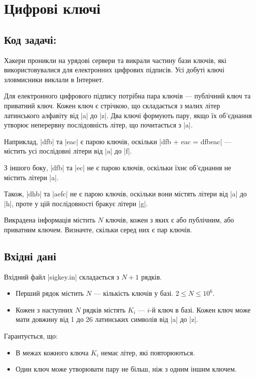 \documentclass[12pt,a4paper]{article}
\begin{document}
\section*{Цифрові ключі \hfill {}}


\subsection*{Код задачі: }

Хакери проникли на урядові сервери та викрали частину бази ключів, які використовувалися для електронних цифрових підписів.
Усі добуті ключі зловмисники виклали в Інтернет.

Для електронного цифрового підпису потрібна пара ключів --- публічний ключ та приватний ключ. Кожен ключ є стрічкою, що складається з малих літер латинського алфавіту від |a| до |z|. Два ключі формують пару, якщо їх об’єднання утворює неперервну послідовність літер, що почитається з |a|.

Наприклад, |dfb| та |eac| є парою ключів, оскільки |dfb + eac = dfbeac| --- містить усі послідовні літери від |a| до |f|.

З іншого боку, |dfb| та |ec| не є парою ключів, оскільки їхнє об'єднання не містить літери |a|.

Також, |dhb| та |aefc| не є парою ключів, оскільки вони містять літери від |a| до |h|, проте у цій послідовності бракує літери |g|.

Викрадена інформація містить \(N\) ключів, кожен з яких є або публічним, або приватним ключем. Визначте, скільки серед них є пар ключів.


\subsection*{Вхідні дані}

Вхідний файл |sigkey.in| складається з \(N + 1\) рядків.

\begin{itemize}
    \item Перший рядок містить \(N\) --- кількість ключів у базі. \(2 \leq N \leq 10^6 \).
    \item Кожен з наступних \(N\) рядків містять \(K_i\) --- \(i\)-й ключ в базі. Кожен ключ може мати довжину від 1 до 26 латинських символів від |a| до |z|.
\end{itemize}

Гарантується, що:
\begin{itemize}
    \item В межах кожного ключа \(K_i\) немає літер, які повторюються.
    \item Один ключ може утворювати пару не більш, ніж з одним іншим ключем.
\end{itemize}
\end{document}
